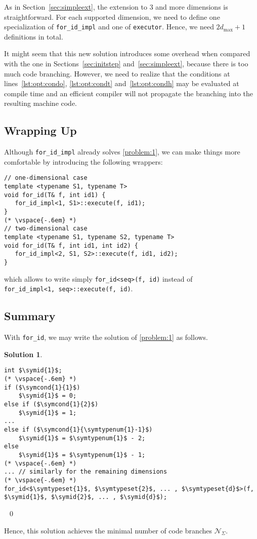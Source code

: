 \documentclass[10pt,a4paper]{article}
\theoremstyle{definition}\newtheorem{problem}{Problem}
\newtheorem{solution}{Solution}
\providecommand{\symdimmax}{\ensuremath{d_{\max}}\xspace}
\providecommand{\symtypeset}[1]{\ensuremath{\mathcal{T}_{#1}}}
\providecommand{\symtypenum}[1]{\ensuremath{n_{#1}}}
\providecommand{\symcond}[2]{\ensuremath{c_{#1}^{#2}}}
\providecommand{\symcbsum}{\ensuremath{\mathcal{N}_{\Sigma}}\xspace}
\providecommand{\symidb}{\ensuremath{\mathit{id}}}
\providecommand{\symid}[1]{\ensuremath{\symidb_{#1}}}
\providecommand{\forid}{\texttt{for\_id}\xspace}
\begin{document}
\begin{enumerate}
\end{enumerate}

As in Section~\ref{sec:simpleext}, the extension to 3 and more dimensions is straightforward. For each supported dimension, we need to define one specialization of \verb|for_id_impl| and one of \verb|executor|. Hence, we need $2\symdimmax+1$ definitions in total.

It might seem that this new solution introduces some overhead when compared with the one in Sections~\ref{sec:initstep} and~\ref{sec:simpleext}, because there is too much code branching. However, we need to realize that the conditions at lines~\ref{lst:opt:condo}, \ref{lst:opt:condt} and~\ref{lst:opt:condh} may be evaluated at compile time and an efficient compiler will not propagate the branching into the resulting machine code.

\subsection{Wrapping Up}

Although \verb|for_id_impl| already solves \autoref{problem:1}, we can make things more comfortable by introducing the following wrappers:
{\small
\begin{lstlisting}
// one-dimensional case
template <typename S1, typename T>
void for_id(T& f, int id1) {
   for_id_impl<1, S1>::execute(f, id1);
}
(* \vspace{-.6em} *)
// two-dimensional case
template <typename S1, typename S2, typename T>
void for_id(T& f, int id1, int id2) {
   for_id_impl<2, S1, S2>::execute(f, id1, id2);
}
\end{lstlisting}
}
\noindent
which allows to write simply \verb|for_id<seq>(f, id)| instead of\\ \verb|for_id_impl<1, seq>::execute(f, id)|.


\subsection{Summary}

With \forid, we may write the solution of \autoref{problem:1} as follows.

\begin{solution}\ \label{solution:2}

\begin{lstlisting}
int $\symid{1}$;
(* \vspace{-.6em} *)
if ($\symcond{1}{1}$)
    $\symid{1}$ = 0;
else if ($\symcond{1}{2}$)
    $\symid{1}$ = 1;
...
else if ($\symcond{1}{\symtypenum{1}-1}$)
    $\symid{1}$ = $\symtypenum{1}$ - 2;
else
    $\symid{1}$ = $\symtypenum{1}$ - 1;
(* \vspace{-.6em} *)
... // similarly for the remaining dimensions
(* \vspace{-.6em} *)
for_id<$\symtypeset{1}$, $\symtypeset{2}$, ... , $\symtypeset{d}$>(f, $\symid{1}$, $\symid{2}$, ... , $\symid{d}$);
\end{lstlisting}

\vspace{-.4em} \ \qed
\end{solution}
\vspace{-.6em}
Hence, this solution achieves the minimal number of code branches \symcbsum. 
\end{document}
